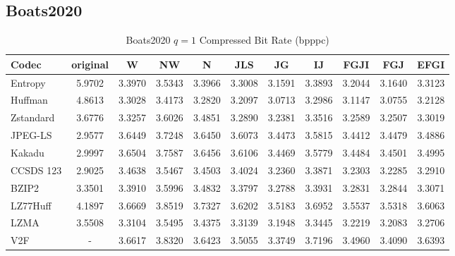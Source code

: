\documentclass{article}
\begin{document}
\subsection{Boats2020}
\begin{table}[h!]
    \centering
    \caption{Boats2020 $q=1$ Compressed Bit Rate (bpppc)}
    \begin{tabular}{|l|cccccccccc|}
        \hline
        Codec &  original &      W &     NW &      N &    JLS &     JG &     IJ &   FGJI &    FGJ &   EFGI \\ \hline
        Entropy & 5.9702 & 3.3970 & 3.5343 & 3.3966 & 3.3008 & 3.1591 & 3.3893 & 3.2044 & 3.1640 & 3.3123 \\ \hline
        Huffman &    4.8613 &  3.3028 &  3.4173 &  3.2820 &  3.2097 &  3.0713 &  3.2986 &  3.1147 &  3.0755 &  3.2128 \\ 
        Zstandard                              &    3.6776 & 3.3257 & 3.6026 & 3.4851 &  3.2890 & 3.2381 & 3.3516 & 3.2589 & 3.2507 & 3.3019 \\ 
        JPEG-LS                                &    2.9577 & 3.6449 & 3.7248 & 3.6450 & 3.6073 & 3.4473 & 3.5815 & 3.4412 & 3.4479 & 3.4886 \\ 
        Kakadu                       &    2.9997 & 3.6504 & 3.7587 & 3.6456 & 3.6106 & 3.4469 & 3.5779 & 3.4484 & 3.4501 & 3.4995 \\ 
        CCSDS 123&  2.9025 & 3.4638 & 3.5467 & 3.4503 & 3.4024 & 3.2360 & 3.3871 & 3.2303 & 3.2285 & 3.2910 \\ 
        BZIP2                               &    3.3501 & 3.3910 & 3.5996 & 3.4832 & 3.3797 & 3.2788 & 3.3931 & 3.2831 & 3.2844 & 3.3071 \\ 
        LZ77Huff                     &    4.1897 & 3.6669 & 3.8519 & 3.7327 & 3.6202 & 3.5183 & 3.6952 & 3.5537 & 3.5318 & 3.6063 \\ 
        LZMA                       &    3.5508 & 3.3104 & 3.5495 & 3.4375 &  3.3139 &  3.1948 &  3.3445 &  3.2219 &  3.2083 &  3.2706 \\ 
        V2F                   &   - & 3.6617 & 3.8320 & 3.6423 & 3.5055 & 3.3749 & 3.7196 & 3.4960 &  3.4090 & 3.6393 \\ 
        \hline
    \end{tabular}
\end{table}
\end{document}
